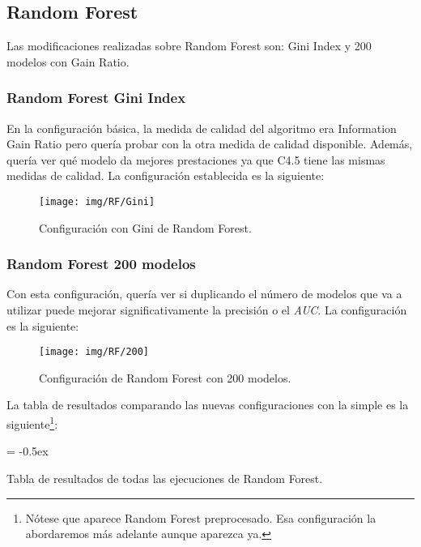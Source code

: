\documentclass[paper=a4, fontsize=12pt]{article} %
\numberwithin{equation}{section} %
\numberwithin{figure}{section} %
\numberwithin{table}{section} %
\begin{document}
\subsection {Random Forest}

Las modificaciones realizadas sobre Random Forest son: Gini Index y 200 modelos con Gain Ratio.
\subsubsection {Random Forest Gini Index}
En la configuración básica, la medida de calidad del algoritmo era Information Gain Ratio pero quería probar con la otra medida de calidad disponible. Además, quería ver qué modelo da mejores prestaciones ya que C4.5 tiene las mismas medidas de calidad. La configuración establecida es la siguiente:

	\begin{figure}[H]
	  \centering
	  \texttt{[image: img/RF/Gini]}
	  \caption{Configuración con Gini de Random Forest.}
	  \label{giniRF}
	\end{figure}

 \subsubsection {Random Forest 200 modelos}
Con esta configuración, quería ver si duplicando el número de modelos que va a utilizar puede mejorar significativamente la precisión o el \textit{AUC}. La configuración es la siguiente:

	\begin{figure}[H]
	  \centering
	  \texttt{[image: img/RF/200]}
	  \caption{Configuración de Random Forest con 200 modelos.}
	  \label{RF200}
	\end{figure}

La tabla de resultados comparando las nuevas configuraciones con la simple es la siguiente\footnote{Nótese que aparece Random Forest preprocesado. Esa configuración la abordaremos más adelante aunque aparezca ya.}:

	\extrarowheight = -0.5ex %
	\renewcommand{\arraystretch}{1.75} %
	\begin{table}[H]
		\begin{center}
		\end{center}
		\caption {Tabla de resultados de todas las ejecuciones de Random Forest.}
		\label {RFcomparation}
	\end{table}
\end{document}
